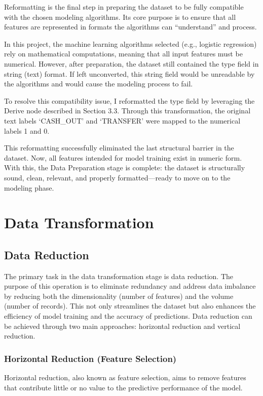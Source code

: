 \documentclass[sigplan,screen]{acmart}
\begin{document}
Reformatting is the final step in preparing the dataset to be fully compatible with the chosen modeling algorithms. Its core purpose is to ensure that all features are represented in formats the algorithms can ``understand'' and process.

In this project, the machine learning algorithms selected (e.g., logistic regression) rely on mathematical computations, meaning that all input features must be numerical. However, after preparation, the dataset still contained the type field in string (text) format. If left unconverted, this string field would be unreadable by the algorithms and would cause the modeling process to fail.

To resolve this compatibility issue, I reformatted the type field by leveraging the Derive node described in Section 3.3. Through this transformation, the original text labels `CASH\_OUT' and `TRANSFER' were mapped to the numerical labels 1 and 0.

This reformatting successfully eliminated the last structural barrier in the dataset. Now, all features intended for model training exist in numeric form. With this, the Data Preparation stage is complete: the dataset is structurally sound, clean, relevant, and properly formatted---ready to move on to the modeling phase.

\section{Data Transformation}

\subsection{Data Reduction}

The primary task in the data transformation stage is data reduction. The purpose of this operation is to eliminate redundancy and address data imbalance by reducing both the dimensionality (number of features) and the volume (number of records). This not only streamlines the dataset but also enhances the efficiency of model training and the accuracy of predictions. Data reduction can be achieved through two main approaches: horizontal reduction and vertical reduction.

\subsubsection{Horizontal Reduction (Feature Selection)}

Horizontal reduction, also known as feature selection, aims to remove features that contribute little or no value to the predictive performance of the model.
\end{document}
